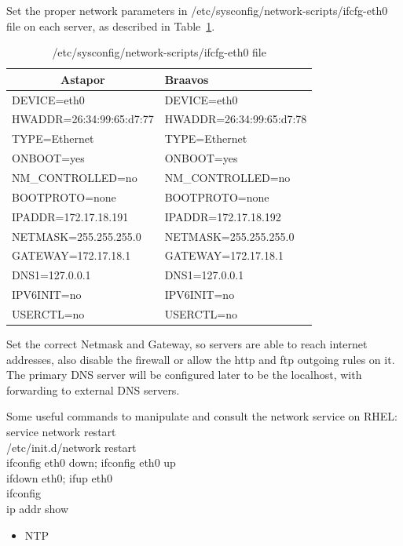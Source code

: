 \documentclass[a4paper, 12pt]{book}
\begin{document}
\noindent Set the proper network parameters in /etc/sysconfig/network-scripts/ifcfg-eth0 file on each server, as described in Table~\ref{table:ifcfg}.

\FloatBarrier
\begin{table}[H]
  \centering
  \begin{tabular}{ | l | l | }
    \hline
    \multicolumn{1}{|c|}{Astapor} & Braavos \\
    \hline
    DEVICE=eth0 & DEVICE=eth0 \\
    HWADDR=26:34:99:65:d7:77 & HWADDR=26:34:99:65:d7:78\\
    TYPE=Ethernet & TYPE=Ethernet\\
    ONBOOT=yes & ONBOOT=yes\\
    NM\_CONTROLLED=no & NM\_CONTROLLED=no\\
    BOOTPROTO=none & BOOTPROTO=none\\
    IPADDR=172.17.18.191 & IPADDR=172.17.18.192\\
    NETMASK=255.255.255.0 & NETMASK=255.255.255.0\\
    GATEWAY=172.17.18.1	& GATEWAY=172.17.18.1\\
	DNS1=127.0.0.1 & DNS1=127.0.0.1\\
	IPV6INIT=no & IPV6INIT=no\\
	USERCTL=no & USERCTL=no\\
    \hline
  \end{tabular}
\caption{/etc/sysconfig/network-scripts/ifcfg-eth0 file}
\label{table:ifcfg}
\end{table}


\noindent Set the correct Netmask and Gateway, so servers are able to reach internet addresses, also disable the firewall or allow the http and ftp outgoing rules on it. The primary DNS server will be configured later to be the localhost, with forwarding to external DNS servers.\bigskip

\noindent Some useful commands to manipulate and consult the network service on RHEL:\\
\indent service network restart\\
\indent /etc/init.d/network restart\\
\indent ifconfig eth0 down; ifconfig eth0 up\\
\indent ifdown eth0; ifup eth0\\
\indent ifconfig\\
\indent ip addr show

\begin{itemize}
	\item NTP
\end{itemize}
\end{document}
